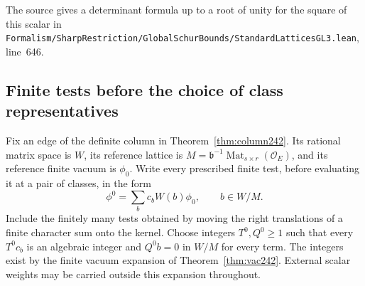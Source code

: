 \documentclass[a4paper,11pt]{article}
\theoremstyle{definition}
\theoremstyle{remark}
\newcommand{\srcloc}[2]{{\small\nolinkurl{#1.lean}}, line~#2}
\numberwithin{equation}{section}
\newcommand{\OO}{\mathcal O}
\begin{document}
The source gives a determinant formula up to a root of unity for
the square of this scalar in
\srcloc{Formalism/SharpRestriction/GlobalSchurBounds/StandardLatticesGL3}{646}.

\subsection{Finite tests before the choice of class representatives}\label{nav:V-61}
Fix an edge of the definite column in Theorem~\ref{thm:column242}.
Its rational matrix space is \(W\), its reference lattice is
\(M=\mathfrak b^{-1}\operatorname{Mat}_{s\times r}(\OO_E)\),
and its reference finite vacuum is \(\phi_0\).
Write every prescribed finite test, before evaluating it at a
pair of classes, in the form
\[
                \phi^0=\sum_b c_b W(b)\phi_0,\qquad b\in W/M .
\]
Include the finitely many tests obtained by moving the right
translations of a finite character sum onto the kernel. Choose
integers \(T^0,Q^0\ge1\) such that every \(T^0 c_b\) is an
algebraic integer and \(Q^0 b=0\) in \(W/M\) for every term.
The integers exist by the finite vacuum expansion of
Theorem~\ref{thm:vac242}. External scalar weights may be carried
outside this expansion throughout.
\end{document}
